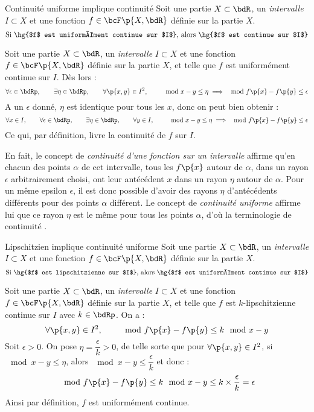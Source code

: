 \documentclass[a4paper,french,bookmarks]{article}
\begin{document}
    \begin{property}{Continuité uniforme implique continuité}{}
        Soit une partie $X \subset \bdR$, un \textit{intervalle} $I \subset X$ et une fonction $f \in \bcF\p{X, \bdR}$ définie sur la partie $X$.
        \[ \text{Si \hg{$f$ est uniformément continue sur $I$}, alors \hg{$f$ est continue sur $I$}} \]
    \end{property}
    \begin{nproof}
        Soit une partie $X \subset \bdR$, un \textit{intervalle} $I \subset X$ et une fonction $f \in \bcF\p{X, \bdR}$ définie sur la partie $X$, et telle que $f$ est uniformément continue sur $I$. Dès lors :
        \[ \forall \epsilon \in \bdRp,\qquad \exists \eta \in \bdRp,\qquad \forall \p{x, y} \in I^2,\qquad \mod{x-y} \leq \eta \implies \mod{f\p{x}-f\p{y}} \leq \epsilon\]
        A un $\epsilon$ donné, $\eta$ est identique pour tous les $x$, donc on peut bien obtenir :
        \[ \forall x \in I,\qquad \forall \epsilon \in \bdRp,\qquad \exists \eta \in \bdRp,\qquad \forall y \in I,\qquad \mod{x-y} \leq \eta \implies \mod{f\p{x}-f\p{y}} \leq \epsilon\]
        Ce qui, par définition, livre la continuité de $f$ sur $I$.
    \end{nproof}
    
    En fait, le concept de \textit{continuité d'une fonction sur un intervalle} affirme qu'en chacun des points $\alpha$ de cet intervalle, tous les $f\p{x}$ autour de $\alpha$, dans un rayon $\epsilon$ arbitrairement choisi, ont leur antécédent $x$ dans un rayon $\eta$ autour de $\alpha$. Pour un même epsilon $\epsilon$, il est donc possible d'avoir des rayons $\eta$ d'antécédents différents pour des points $\alpha$ différent. Le concept de \textit{continuité uniforme} affirme lui que ce rayon $\eta$ est le même pour tous les points $\alpha$, d'où la terminologie de continuité .
    
    \begin{property}{Lipschitzien implique continuité uniforme}
        Soit une partie $X \subset \bdR$, un \textit{intervalle} $I \subset X$ et une fonction $f \in \bcF\p{X, \bdR}$ définie sur la partie $X$.
        \[ \text{Si \hg{$f$ est lipschitzienne sur $I$}, alors \hg{$f$ est uniformément continue sur $I$}} \]
    \end{property}
    \begin{nproof}
        Soit une partie $X \subset \bdR$, un \textit{intervalle} $I \subset X$ et une fonction $f \in \bcF\p{X, \bdR}$ définie sur la partie $X$, et telle que $f$ est $k$-lipschitzienne continue sur $I$ avec $k \in \bdRp$. On a :
        \[ \forall \p{x, y} \in I^2,\qquad \mod{f\p{x} - f\p{y}} \leq k\mod{x - y} \]
        Soit $\epsilon > 0$. On pose $\eta = \dfrac{\epsilon}{k} > 0$, de telle sorte que pour $\forall \p{x, y} \in I^2$, si $\mod{x - y} \leq \eta$, alors $\mod{x - y} \leq \dfrac{\epsilon}{k}$ et donc :
        \[ \mod{f\p{x} - f\p{y}} \leq k\mod{x - y} \leq k\times\dfrac{\epsilon}{k} = \epsilon \]
        Ainsi par définition, $f$ est uniformément continue.
    \end{nproof}
    
\end{document}
